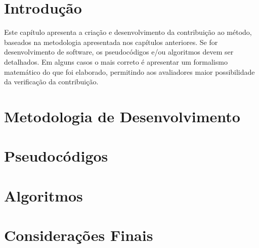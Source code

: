 \section{Introdução}
Este capítulo apresenta a criação e desenvolvimento da contribuição ao método, baseados na metodologia apresentada nos capítulos anteriores. Se for desenvolvimento de software, os pseudocódigos e/ou algoritmos devem ser detalhados. Em alguns casos o mais correto é apresentar um formalismo matemático do que foi elaborado, permitindo aos avaliadores maior possibilidade da verificação da contribuição.

\section{Metodologia de Desenvolvimento}
\section{Pseudocódigos}
\section{Algoritmos}

\section{Considerações Finais}



